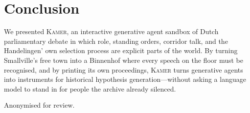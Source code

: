 \documentclass[sigconf,review,anonymous]{acmart}
\newcommand{\sys}{\textsc{Kamer}}
\begin{document}
\section{Conclusion}
\label{sec:conclusion}

We presented \sys{}, an interactive generative agent sandbox of Dutch
parliamentary debate in which role, standing orders, corridor talk, and
the Handelingen' own selection process are explicit parts of the world. By
turning Smallville's free town into a Binnenhof where every speech on the
floor must be recognised, and by printing its own proceedings, \sys{}
turns generative agents into instruments for historical hypothesis
generation---without asking a language model to stand in for people the
archive already silenced.

\begin{acks}
Anonymised for review.
\end{acks}



\end{document}
